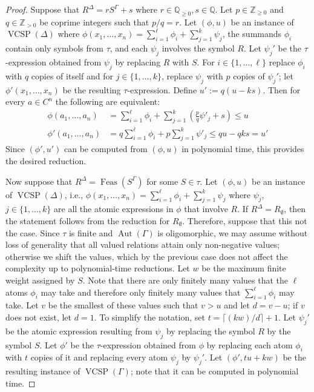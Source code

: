 \documentclass[nonacm]{acmart}
\newcommand{\Q}{\mathbb Q}
\newcommand{\Z}{\mathbb Z}
\DeclareMathOperator{\Aut}{Aut}
\DeclareMathOperator{\VCSP}{VCSP}
\DeclareMathOperator{\Feas}{Feas}
\begin{document}
\begin{proof}
Suppose that $R^{\Delta}=rS^{\Gamma}+s$ where $r \in \Q_{\geq 0}, s \in \Q$. Let $p\in \Z_{\geq 0}$ and $q \in \Z_{>0}$ be coprime integers such that $p/q = r$. Let $(\phi, u)$ be an instance of $\VCSP(\Delta)$ where $\phi(x_1, \dots, x_n)=\sum_{i=1}^{\ell} \phi_i + \sum_{j=1}^k \psi_j$, the summands $\phi_i$ contain only symbols from $\tau$, and each $\psi_j$ involves the symbol $R$. Let $\psi_j'$ be the $\tau$-expression obtained from $\psi_j$ by replacing $R$ with $S$.
For $i \in \{1, \dots, \ell\}$ replace $\phi_i$ with $q$ copies of itself and for $j \in \{1, \dots, k\}$, replace $\psi_j$ with $p$ copies of $\psi_j'$; let $\phi'(x_1, \dots, x_n)$ be the resulting $\tau$-expression. Define $u':= q(u-ks)$. Then for every $a \in C^n$ the following are equivalent:
\begin{align*}
 \phi(a_1, \dots, a_n) & = \sum_{i=1}^{\ell} \phi_i+  \sum_{j=1}^k \left(\frac{p}{q} \psi'_j + s \right)  \leq u  \\
  \phi'(a_1, \dots, a_n) & = q\sum_{i=1}^{\ell} \phi_i+ p \sum_{j=1}^k \psi'_j  \leq qu-qks = u'
\end{align*}
Since $(\phi', u')$ can be computed from $(\phi, u)$ in polynomial time, this provides the desired reduction.

Now suppose that $R^{\Delta}=\Feas(S^{\Gamma})$ for some $S\in \tau$. Let $(\phi,u)$ be an instance of $\VCSP(\Delta)$, i.e., $\phi(x_1, \dots, x_n)=\sum_{i=1}^{\ell} \phi_i + \sum_{j=1}^k \psi_j$ where $\psi_j$, $j \in \{1, \dots, k\}$ are all the atomic expressions in $\phi$ that involve $R$. If $R^\Delta=R_{\emptyset}$, then the statement follows from the reduction for $R_\emptyset$. Therefore, suppose that this not the case. Since $\tau$ is finite and $\Aut(\Gamma)$ is oligomorphic, we may assume without loss of generality that all valued relations attain only non-negative values; otherwise we shift the values, which by the previous case does not affect the complexity up to polynomial-time reductions. Let $w$ be the maximum finite weight assigned by $S$. Note that there are only finitely many values that the $\ell$ atoms $\phi_i$ may take and therefore only finitely many values that $\sum_{i=1}^{\ell} \phi_i$ may take. Let $v$ be the smallest of these values such that $v>u$ and let $d = v-u$; if $v$ does not exist, let $d=1$. To simplify the notation, set $t = \lceil (kw)/d \rceil + 1$. Let $\psi_j'$ be the atomic expression resulting from $\psi_j$ by replacing the symbol $R$ by the symbol $S$. Let $\phi'$ be the $\tau$-expression obtained from $\phi$ by replacing each atom $\phi_i$ with $t$ copies of it and replacing every atom $\psi_j$ by $\psi_j'$. Let $(\phi', tu+kw)$ be the resulting instance of $\VCSP(\Gamma)$; note that it can be computed in polynomial time.



\end{proof}
\end{document}
